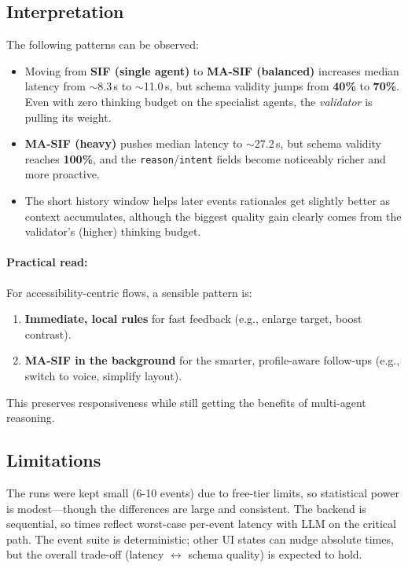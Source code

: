 \subsection*{Interpretation}
The following patterns can be observed:
\begin{itemize}
    \item Moving from \textbf{SIF (single agent)} to \textbf{MA\mbox{-}SIF (balanced)} increases median latency from $\sim$8.3\,s to $\sim$11.0\,s, but schema validity jumps from \textbf{40\%} to \textbf{70\%}. Even with zero thinking budget on the specialist agents, the \emph{validator} is pulling its weight.
    \item \textbf{MA\mbox{-}SIF (heavy)} pushes median latency to $\sim$27.2\,s, but schema validity reaches \textbf{100\%}, and the \texttt{reason}/\texttt{intent} fields become noticeably richer and more proactive.
    \item The short history window helps later events rationales get slightly better as context accumulates, although the biggest quality gain clearly comes from the validator’s (higher) thinking budget.
\end{itemize}

\paragraph{Practical read:} For accessibility-centric flows, a sensible pattern is:
\begin{enumerate}
    \item \textbf{Immediate, local rules} for fast feedback (e.g., enlarge target, boost contrast).
    \item \textbf{MA-SIF in the background} for the smarter, profile-aware follow-ups (e.g., switch to voice, simplify layout).
\end{enumerate}
This preserves responsiveness while still getting the benefits of multi-agent reasoning.

\subsection*{Limitations}
The runs were kept small (6-10 events) due to free-tier limits, so statistical power is modest—though the differences are large and consistent. The backend is sequential, so times reflect worst-case per-event latency with LLM on the critical path. The event suite is deterministic; other UI states can nudge absolute times, but the overall trade-off (latency $\leftrightarrow$ schema quality) is expected to hold.

